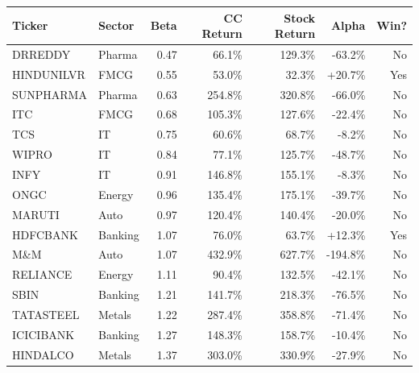 \begin{tabular}{llrrrrr}
    \toprule
    \textbf{Ticker} & \textbf{Sector} & \textbf{Beta} & \textbf{CC Return} & \textbf{Stock Return} & \textbf{Alpha} & \textbf{Win?} \\
    \midrule
    DRREDDY & Pharma & 0.47 & 66.1\% & 129.3\% & -63.2\% & No \\
    HINDUNILVR & FMCG & 0.55 & 53.0\% & 32.3\% & +20.7\% & Yes \\
    SUNPHARMA & Pharma & 0.63 & 254.8\% & 320.8\% & -66.0\% & No \\
    ITC & FMCG & 0.68 & 105.3\% & 127.6\% & -22.4\% & No \\
    TCS & IT & 0.75 & 60.6\% & 68.7\% & -8.2\% & No \\
    WIPRO & IT & 0.84 & 77.1\% & 125.7\% & -48.7\% & No \\
    INFY & IT & 0.91 & 146.8\% & 155.1\% & -8.3\% & No \\
    ONGC & Energy & 0.96 & 135.4\% & 175.1\% & -39.7\% & No \\
    MARUTI & Auto & 0.97 & 120.4\% & 140.4\% & -20.0\% & No \\
    HDFCBANK & Banking & 1.07 & 76.0\% & 63.7\% & +12.3\% & Yes \\
    M\&M & Auto & 1.07 & 432.9\% & 627.7\% & -194.8\% & No \\
    RELIANCE & Energy & 1.11 & 90.4\% & 132.5\% & -42.1\% & No \\
    SBIN & Banking & 1.21 & 141.7\% & 218.3\% & -76.5\% & No \\
    TATASTEEL & Metals & 1.22 & 287.4\% & 358.8\% & -71.4\% & No \\
    ICICIBANK & Banking & 1.27 & 148.3\% & 158.7\% & -10.4\% & No \\
    HINDALCO & Metals & 1.37 & 303.0\% & 330.9\% & -27.9\% & No \\
    \bottomrule
\end{tabular}
